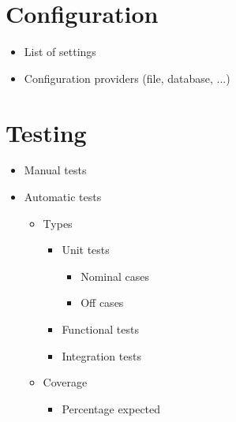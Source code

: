 \documentclass[10pt]{article}
\begin{document}
  \section*{Configuration}
  \begin{itemize}    
    \item List of settings
    \item Configuration providers (file, database, ...)
  \end{itemize}
  
  \section*{Testing}
  \begin{itemize}
    \item Manual tests
    \item Automatic tests
    \begin{itemize}
      \item Types
      \begin{itemize}
        \item Unit tests
        \begin{itemize}
          \item Nominal cases
          \item Off cases
        \end{itemize}
        \item Functional tests
        \item Integration tests
      \end{itemize}
      \item Coverage
      \begin{itemize}
        \item Percentage expected
      \end{itemize}
    \end{itemize}
  \end{itemize}
  
\end{document}
